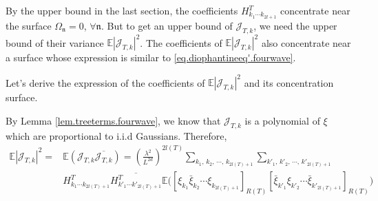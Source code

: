  By the upper bound in the last section, the coefficients $H^T_{k_1\cdots k_{2l+1}}$ concentrate near the surface $\Omega_{\mathfrak{n}}=0$, $\forall \mathfrak{n}$. But to get an upper bound of $\mathcal{J}_{T,k}$, we need the upper bound of their variance $\mathbb{E}|\mathcal{J}_{T,k}|^2$. The coefficients of $\mathbb{E}|\mathcal{J}_{T,k}|^2$ also concentrate near a surface whose expression is similar to \eqref{eq.diophantineeq'.fourwave}. 
 
 Let's derive the expression of the coefficients of $\mathbb{E}|\mathcal{J}_{T,k}|^2$ and its concentration surface.
 
 
 
 By Lemma \ref{lem.treeterms.fourwave}, we know that $\mathcal{J}_{T,k}$ is a polynomial of $\xi$ which are proportional to i.i.d Gaussians. Therefore, 
 \begin{equation}\label{eq.termexp1.fourwave}
 \begin{split}
  \mathbb{E}|\mathcal{J}_{T,k}|^2=&\mathbb{E}(\mathcal{J}_{T,k}\overline{\mathcal{J}_{T,k}})=\left(\frac{\lambda^2}{L^{2d}}\right)^{2l(T)}
  \sum_{k_1,\, k_2,\, \cdots,\, k_{2l(T)+1}}\sum_{k'_1,\, k'_2,\, \cdots,\, k'_{2l(T)+1}}
  \\[0.5em]
  & H^T_{k_1\cdots k_{2l(T)+1}} \overline{H^{T}_{k'_1\cdots k'_{2l(T)+1}}} \mathbb{E}\Big([\xi_{k_1}\bar{\xi}_{k_2}\cdots\xi_{k_{2l(T)+1}}]_{R(T)}
  [\bar{\xi}_{k'_1}\xi_{k'_2}\cdots\bar{\xi}_{k'_{2l(T)+1}}]_{R(T)}\Big)
 \end{split}
 \end{equation}
 
